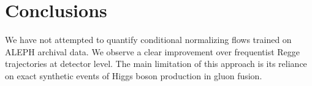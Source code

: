 \section{Conclusions}\label{sec:conclusions}

We have not attempted to quantify conditional normalizing flows trained
on ALEPH archival data. We observe a clear improvement over frequentist
Regge trajectories at detector level. The main limitation of this
approach is its reliance on exact synthetic events of Higgs boson
production in gluon fusion.

